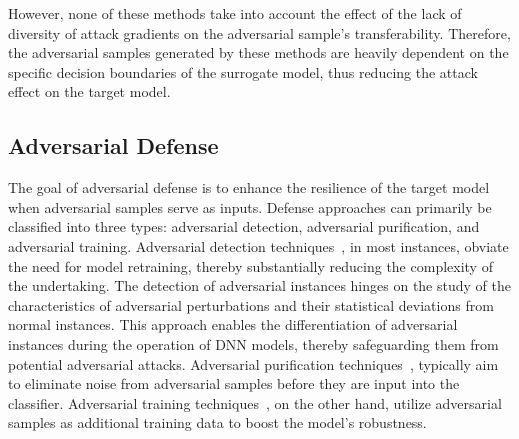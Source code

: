 However, none of these methods take into account the effect of the lack of diversity of attack gradients on the adversarial sample's transferability. Therefore, the adversarial samples generated by these methods are heavily dependent on the specific decision boundaries of the surrogate model, thus reducing the attack effect on the target model.

\subsection{Adversarial Defense}

The goal of adversarial defense is to enhance the resilience of the target model when adversarial samples serve as inputs. Defense approaches can primarily be classified into three types: adversarial detection, adversarial purification, and adversarial training. Adversarial detection techniques~\cite{wang2019adversarial,meng2017magnet,liang2018detecting,zheng2018robust}, in most instances, obviate the need for model retraining, thereby substantially reducing the complexity of the undertaking. The detection of adversarial instances hinges on the study of the characteristics of adversarial perturbations and their statistical deviations from normal instances. This approach enables the differentiation of adversarial instances during the operation of DNN models, thereby safeguarding them from potential adversarial attacks. Adversarial purification techniques~\cite{liao2018defense,liu2019feature,jia2019comdefend}, typically aim to eliminate noise from adversarial samples before they are input into the classifier. Adversarial training techniques~\cite{madry2017towards,tramer2017ensemble,pang2020boosting}, on the other hand, utilize adversarial samples as additional training data to boost the model's robustness.